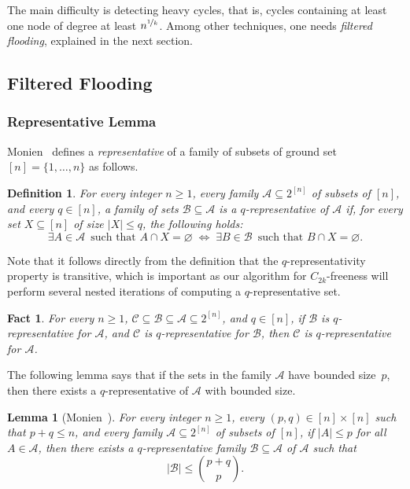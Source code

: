 \documentclass{article}
\newtheorem{lemma}{Lemma}
\newtheorem{definition}{Definition}
\newtheorem{fact}{Fact}
\begin{document}
The main difficulty is detecting heavy cycles, that is, cycles containing at least one node of degree at least $n^{\nicefrac{1}{k}}$. Among other techniques, one needs \emph{filtered flooding}, explained in the next section.  

\subsection{Filtered Flooding}


\subsubsection{Representative Lemma} 

Monien~\cite{monien85} defines a \emph{representative} of a family of subsets of ground set $[n]=\{1,\dots,n\}$ as follows. 

\begin{definition}\label{def:q-rep}
For every integer $n\geq 1$, every family $\mathcal{A}\subseteq 2^{[n]}$ of subsets of $[n]$, and every $q\in [n]$, a family of sets $\mathcal{B}\subseteq \mathcal{A}$ is a \emph{$q$-representative} of $\mathcal{A}$ if, for every set $X\subseteq [n]$ of size $|X|\leq q$, the following holds:
\[
\exists A\in\mathcal{A} \,\text{ such that } A\cap X = \varnothing 
\;\iff\; 
\exists B \in \mathcal{B} \,\text{ such that } B \cap X = \varnothing.
\]
\end{definition}

Note that it follows directly from the definition that the $q$-representativity property is transitive, which is important as our algorithm for $C_{2k}$-freeness will perform several nested iterations of computing a $q$-representative set.  

\begin{fact}\label{lem:rep_transi}
For every $n\geq 1$, $\mathcal{C}\subseteq\mathcal{B}\subseteq\mathcal{A}\subseteq 2^{[n]}$, and $q\in [n]$, if $\mathcal{B}$ is $q$-representative for $\mathcal{A}$, and $\mathcal{C}$ is $q$-representative for $\mathcal{B}$, then $\mathcal{C}$ is $q$-representative for $\mathcal{A}$.
\end{fact}

The following lemma says that if the sets in the family $\mathcal{A}$ have bounded size~$p$, then there exists a $q$-representative of $\mathcal{A}$ with bounded size. 

\begin{lemma}[Monien~\cite{monien85}]\label{lem:erdos}
For every integer $n\geq 1$, every $(p,q)\in [n]\times [n]$ such that $p+q\leq n$, and every family $\mathcal{A}\subseteq 2^{[n]}$ of subsets of $[n]$, if $|A|\leq p$ for all $A\in\mathcal{A}$, then  
there exists a $q$-representative family $\mathcal{B}\subseteq \mathcal{A}$ of $\mathcal{A}$ such that 
\[
|\mathcal{B}|\leq \binom{p+q}{p}.
\]
\end{lemma}
\end{document}
